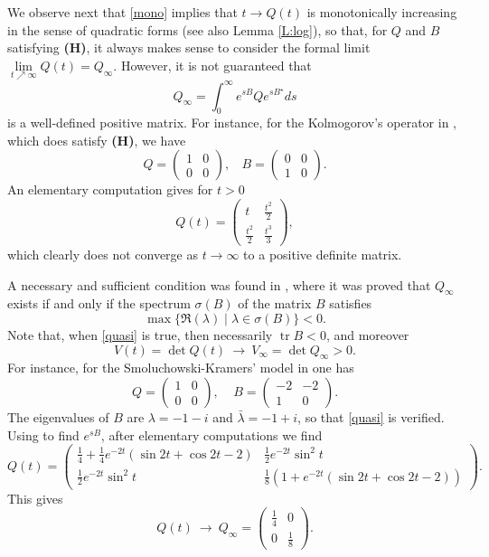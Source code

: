 \documentclass[11pt,letter]{amsart}
\newcommand{\la}{\lambda}
\numberwithin{equation}{section}
\newcommand{\tr}{\operatorname{tr}}
\numberwithin{equation}{section}
\begin{document}
 




We observe next that \eqref{mono} implies that $t\to Q(t)$ is monotonically increasing in the sense of quadratic forms (see also Lemma \ref{L:log}), so that, for $Q$ and $B$ satisfying \textbf{(H)}, it always makes sense to consider the formal limit $\underset{t\nearrow \infty}{\lim} Q(t) = Q_\infty$. However, it is not guaranteed that 
\[
Q_\infty = \int_0^\infty e^{sB}Q e^{sB^\star} ds
\]
is a well-defined positive matrix. For instance, for the Kolmogorov's operator in \cite{Kol}, which does satisfy \textbf{(H)}, we have
\[
Q = \begin{pmatrix} 1 & 0\\ 0 & 0\end{pmatrix},\ \ \ \  B = \begin{pmatrix} 0 & 0\\ 1 & 0\end{pmatrix}.
\]
An elementary computation gives for $t>0$ 
\[
Q(t) = \begin{pmatrix} t & \frac{t^2}2\\ \frac{t^2}2 & \frac{t^3}3\end{pmatrix},
\]
which clearly does not converge as $t\to \infty$ to a positive definite matrix. 

A necessary and sufficient condition was found in \cite[Sec.6]{DZ}, where it was proved that $Q_\infty$ exists if and only if the spectrum $\sigma(B)$ of the matrix $B$ satisfies 
\begin{equation}\label{quasi}
\max\{\Re(\lambda)\mid \lambda\in \sigma(B)\}< 0.
\end{equation}
Note that, when \eqref{quasi} is true, then necessarily $\tr B < 0$, and moreover 
\begin{equation}\label{quasinfty}
V(t) = \det Q(t) \ \longrightarrow\ V_\infty = \det Q_\infty > 0.
\end{equation}
For instance, for the Smoluchowski-Kramers' model in \cite{Fre} one has
\begin{equation}\label{skeigenv}
Q = \begin{pmatrix} 1 & 0\\ 0& 0\end{pmatrix},\ \ \ \ \  B = \begin{pmatrix} -2 & -2\\ 1 & 0\end{pmatrix}.
\end{equation} 
The eigenvalues of $B$ are $\la = -1-i$ and $\bar \la = -1+i$, so that \eqref{quasi} is verified. Using \cite[Prop.15.3.2]{Bernie} to find $e^{sB}$, after elementary computations we find
\[
Q(t) = \begin{pmatrix} \frac 14 + \frac{1}4 e^{-2t}(\sin 2t + \cos 2t - 2) & \frac 12 e^{-2t} \sin^2 t \\  \frac 12 e^{-2t} \sin^2 t & \frac 18(1+ e^{-2t}(\sin 2t + \cos 2t - 2))\end{pmatrix}.
\] 
This gives
\[
Q(t)\ \longrightarrow\ Q_\infty = \begin{pmatrix} \frac 14  & 0\\ 0 & \frac 18 \end{pmatrix}.
\] 
\end{document}

